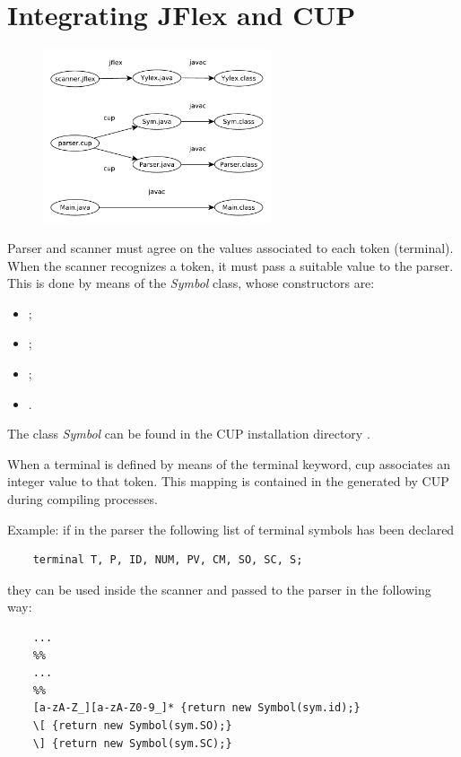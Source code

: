 \section{Integrating JFlex and CUP}
\begin{figure}[H]
	\centerline{\includegraphics[width=0.6\textwidth]{img/19.pdf}}
\end{figure}

Parser and scanner must agree on the values associated to each token (terminal).
When the scanner recognizes a token, it must pass a suitable value to the parser.
This is done by means of the \emph{Symbol} class, whose constructors are:
\begin{itemize}
	\item
	;
	\item
	;
	\item
	;
	\item
	.
\end{itemize}
The class \emph{Symbol} can be found in the CUP installation directory .

When a terminal is defined by means of the terminal keyword, cup associates an integer value to that token.
This mapping is contained in the  generated by CUP during compiling processes.

Example: if in the parser the following list of terminal symbols has been declared
\begin{lstlisting}
	terminal T, P, ID, NUM, PV, CM, SO, SC, S;
\end{lstlisting}
they can be used inside the scanner and passed to the parser in the following way:
\begin{lstlisting}
	...
	%%
	...
	%%
	[a-zA-Z_][a-zA-Z0-9_]* {return new Symbol(sym.id);}
	\[ {return new Symbol(sym.SO);}
	\] {return new Symbol(sym.SC);}
\end{lstlisting}

